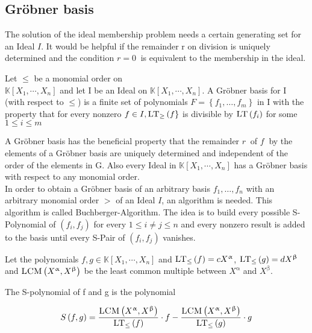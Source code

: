 \subsection{Gröbner basis}
\label{subsec:Groebner}

The solution of the ideal membership problem needs a certain generating set for an Ideal $I$. It would be helpful if the remainder r on division is uniquely determined and the condition $ r = 0~$ is equivalent to the membership in the ideal.



\begin{env_definition}
\cite{KHZ}
Let $\leq$ be a monomial order on \\ $\mathbb{K}\left[X_{1}, \cdots, X_{n}\right]$ and let I be an Ideal on $ \mathbb{K}\left[X_{1}, \cdots, X_{n}\right]  $. A Gröbner basis for I (with respect to $\leq$) is a finite set of polynomials $ F = \left\lbrace f_{1}, \ldots , f_{m} \right\rbrace $ in I with the property that for every nonzero $ f \in I , \textsc{LT}_{\geq}\left( f\right\rbrace $ is divisible by $\textsc{LT}\left( f_{i}\right) $ for some $ 1 \leq i \leq m $

\end{env_definition}

A Gröbner basis has the beneficial property that the remainder $r~$ of $f~$ by the elements of a Gröbner basis are uniquely determined and independent of the order of the elements in G.
Also every Ideal in $\mathbb{K}\left[X_{1}, \cdots, X_{n}\right]$ has a Gröbner basis with respect to any monomial order\cite{KHZ}.\\ 


In order to obtain a Gröbner basis of an arbitrary basis $f_{1}, \ldots , f_{n}$ with an arbitrary monomial order $>$ of an Ideal $I$, an algorithm is needed. This algorithm is called Buchberger-Algorithm. The idea is to build every possible S-Polynomial of $\left( f_{i},f_{j}\right) $ for every $ 1 \leq i \neq j \leq n $ and every nonzero result is added to the basis until every S-Pair of $\left( f_{i},f_{j}\right) $ vanishes.

Let the polynomials $f,g \in \mathbb{K}\left[X_{1}, \cdots, X_{n}\right] $ and $\textsc{LT}_{\leq}\left(f \right) = cX^{\upalpha} $, $\textsc{LT}_{\leq}\left(g \right) = dX^{\upbeta} $ and $\textsc{LCM}\left( X^{\upalpha},X^{\upbeta}\right) $ be the least common multiple between $X^{\upalpha}$ and $X^{\upbeta}$. 

\begin{env_definition}[S-Polynomial]
\cite{KHZ} The S-polynomial of f and g is the polynomial

\[ S\left( f,g\right) = \frac{\textsc{LCM}\left( X^{\upalpha}, X^{\upbeta}\right) }{\textsc{LT}_{\leq}\left( f\right) } \cdot f - \frac{ \textsc{LCM}\left( X^{\upalpha}, X^{\upbeta}\right) }{\textsc{LT}_{\leq}\left( g\right) } 
\cdot g \]


\end{env_definition}


